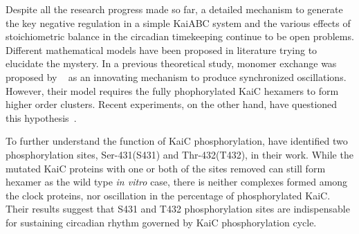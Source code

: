 \documentclass[a4paper,10pt]{article}
\numberwithin{equation}{section}
\begin{document}
Despite all the research progress made so far, a detailed mechanism  to generate the key negative regulation in a simple KaiABC system and the  various  effects of stoichiometric balance in the circadian timekeeping continue to be open problems. Different mathematical models have been proposed in literature trying to elucidate the mystery. In a previous theoretical study, monomer exchange was proposed by ~\citet{emberly2006} as an innovating mechanism to produce synchronized oscillations. However, their model requires the fully phophorylated KaiC hexamers to form higher order clusters. Recent experiments, on the other hand, have questioned this hypothesis~\citet{kageyama2006}.  


To further understand the function of KaiC phosphorylation, \citet{nishiwaki2004} have identified two phosphorylation sites, Ser-431(S431) and Thr-432(T432), in their work. While the mutated KaiC proteins with one or both of the sites removed can still form hexamer as the wild type \textit{in vitro} case, there is neither complexes formed among the clock proteins, nor oscillation in the percentage of phosphorylated KaiC. Their results suggest that S431 and T432 phosphorylation sites are indispensable for sustaining circadian rhythm governed by KaiC phosphorylation cycle. 
\end{document}
